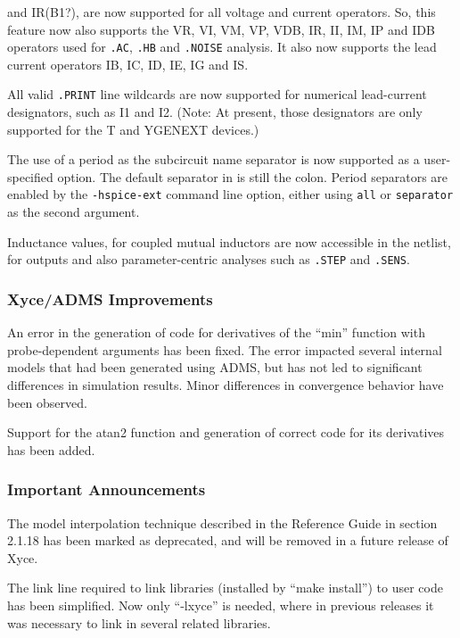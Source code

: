 \documentclass[letterpaper]{scrartcl}
\begin{document}
\begin{XyceItemize}
    and IR(B1?), are now supported for all voltage and current
    operators.  So, this feature now also supports the VR, VI, VM, VP,
    VDB, IR, II, IM, IP and IDB operators used for \texttt{.AC},
    \texttt{.HB} and \texttt{.NOISE} analysis.  It also now supports
    the lead current operators IB, IC, ID, IE, IG and IS.
  \item All valid \texttt{.PRINT} line wildcards are now supported for
    numerical lead-current designators, such as I1 and I2.  (Note: At
    present, those designators are only supported for the T and
    YGENEXT devices.)
  \item The use of a period as the subcircuit name separator is now
    supported as a user-specified option.  The default separator in
    \Xyce{} is still the colon.  Period separators are enabled by the
    \texttt{-hspice-ext} command line option, either using
    \texttt{all} or \texttt{separator} as the second argument.
  \item Inductance values, for coupled mutual inductors are now
    accessible in the netlist, for outputs and also parameter-centric
    analyses such as \texttt{.STEP} and \texttt{.SENS}.

\end{XyceItemize}

\subsubsection*{Xyce/ADMS Improvements}
\begin{XyceItemize}
  \item An error in the generation of code for derivatives of the
    ``min'' function with probe-dependent arguments has been fixed.
    The error impacted several internal models that had been generated
    using ADMS, but has not led to significant differences in
    simulation results.  Minor differences in convergence behavior
    have been observed.
  \item Support for the atan2 function and generation of correct code
    for its derivatives has been added.
\end{XyceItemize}

\subsubsection*{Important Announcements}
\begin{XyceItemize}
\item The model interpolation technique described in the \Xyce{}
  Reference Guide in section 2.1.18 has been marked as deprecated, and
  will be removed in a future release of Xyce.
\item The link line required to link \Xyce{} libraries (installed by
  ``make install'') to user code has been simplified.  Now only
  ``-lxyce'' is needed, where in previous releases it was necessary to
  link in several related libraries.
\end{XyceItemize}
\end{document}
